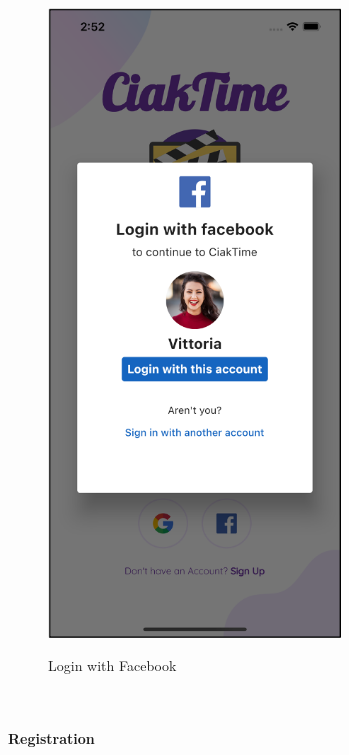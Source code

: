 \documentclass[12pt, a4paper]{article}
\numberwithin{figure}{section}
\begin{document}
\begin{center}
\begin{minipage}[t]{0.32\textwidth}
\begin{figure}[H]
			\centering
			\includegraphics[width=0.69\textwidth]{images/final/loginFacebook.png}\\
			\caption{Login with Facebook}
		\end{figure}
	\end{minipage}
\end{center}

\mbox{}\\

\paragraph{Registration}
\end{document}
